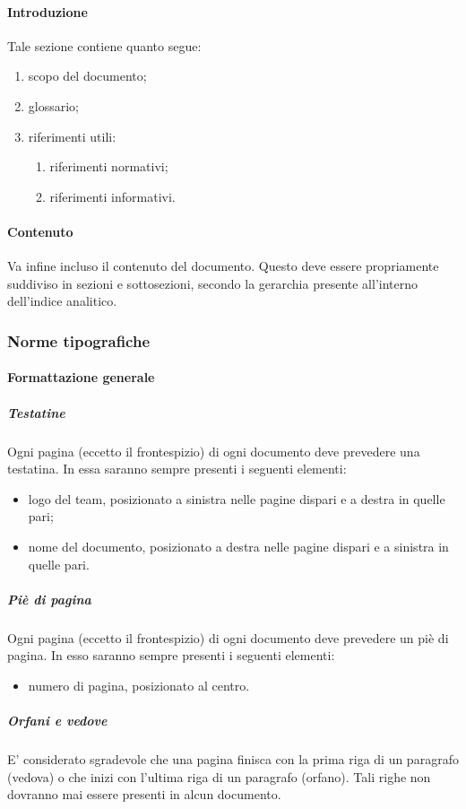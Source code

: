 			\paragraph{Introduzione}
				Tale sezione contiene quanto segue:
				\begin{enumerate}
					\item scopo del documento;
					\item glossario;
					\item riferimenti utili:
					\begin{enumerate}
						\item riferimenti normativi;
						\item riferimenti informativi.
					\end{enumerate}
				\end{enumerate}
			\paragraph{Contenuto}
				Va infine incluso il contenuto del documento. Questo deve essere propriamente suddiviso in sezioni e sottosezioni, secondo la gerarchia presente all’interno dell’indice analitico.
		\subsubsection{Norme tipografiche}
			\paragraph{Formattazione generale}
				\subparagraph{Testatine}
					Ogni pagina (eccetto il frontespizio) di ogni documento deve prevedere una testatina. In essa saranno sempre presenti i seguenti elementi:
					\begin{itemize}
						\item logo del team, posizionato a sinistra nelle pagine dispari e a destra in quelle pari;
						\item nome del documento, posizionato a destra nelle pagine dispari e a sinistra in quelle pari.
					\end{itemize}
				\subparagraph{Piè di pagina}
					Ogni pagina (eccetto il frontespizio) di ogni documento deve prevedere un piè di pagina. In esso saranno sempre presenti i seguenti elementi:
					\begin{itemize}
						\item numero di pagina, posizionato al centro.
					\end{itemize}
				\subparagraph{Orfani e vedove}
					E’ considerato sgradevole che una pagina finisca con la prima riga di un paragrafo (vedova) o che inizi con l’ultima riga di un paragrafo (orfano). Tali righe non dovranno mai essere presenti in alcun documento.
